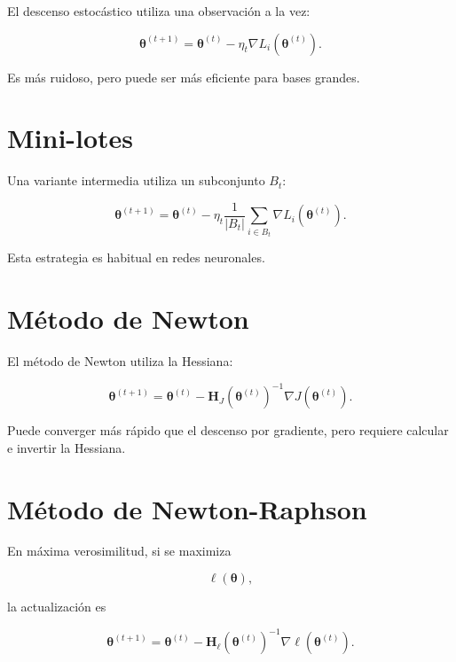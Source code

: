 \documentclass[
  spanish,
  10.5pt,
  letterpaper,
  DIV=11,
  numbers=noendperiod,
  oneside,
  open=any]{scrreprt}
\theoremstyle{definition}
\theoremstyle{definition}
\theoremstyle{plain}
\theoremstyle{remark}
\begin{document}

El descenso estocástico utiliza una observación a la vez:

\[
\boldsymbol{\theta}^{(t+1)}
=
\boldsymbol{\theta}^{(t)}
-
\eta_t
\nabla L_i(
\boldsymbol{\theta}^{(t)}
).
\]

Es más ruidoso, pero puede ser más eficiente para bases grandes.

\section*{Mini-lotes}\label{mini-lotes}


Una variante intermedia utiliza un subconjunto \(B_t\):

\[
\boldsymbol{\theta}^{(t+1)}
=
\boldsymbol{\theta}^{(t)}
-
\eta_t
\frac{1}{|B_t|}
\sum_{i\in B_t}
\nabla L_i(
\boldsymbol{\theta}^{(t)}
).
\]

Esta estrategia es habitual en redes neuronales.

\section*{Método de Newton}\label{muxe9todo-de-newton}


El método de Newton utiliza la Hessiana:

\[
\boldsymbol{\theta}^{(t+1)}
=
\boldsymbol{\theta}^{(t)}
-
\mathbf{H}_J(
\boldsymbol{\theta}^{(t)}
)^{-1}
\nabla J(
\boldsymbol{\theta}^{(t)}
).
\]

Puede converger más rápido que el descenso por gradiente, pero requiere
calcular e invertir la Hessiana.

\section*{Método de Newton-Raphson}\label{muxe9todo-de-newton-raphson}


En máxima verosimilitud, si se maximiza

\[
\ell(\boldsymbol{\theta}),
\]

la actualización es

\[
\boldsymbol{\theta}^{(t+1)}
=
\boldsymbol{\theta}^{(t)}
-
\mathbf{H}_{\ell}(
\boldsymbol{\theta}^{(t)}
)^{-1}
\nabla\ell(
\boldsymbol{\theta}^{(t)}
).
\]
\end{document}
